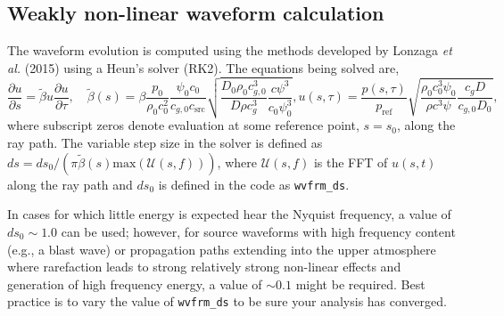\documentclass[10pt]{article}
\begin{document}
\subsection{Weakly non-linear waveform calculation}

The waveform evolution is computed using the methods developed by Lonzaga \textit{et al.} (2015) using a Heun's solver (RK2).  The equations being solved are,
\begin{subequations}
\begin{equation}
\frac{\partial u}{\partial s} = \tilde{\beta} u \frac{\partial u}{\partial \tau}, \quad 
\tilde{\beta} \left( s\right) = \beta \frac{p_0}{\rho_0 c_0^2} \frac{\psi_0 c_0}{c_{g,0} c_\text{src}} \sqrt{ \frac{D_0 \rho_0 c_{g,0}^3}{D \rho c_g^3} \frac{c \psi^3}{c_0 \psi_0^3}},
\end{equation}
\begin{equation}
 u \left( s, \tau \right) = \frac{p \left( s, \tau \right)}{p_\text{ref}} \sqrt{ \frac{\rho_0 c_0^3 \psi_0}{\rho c^3 \psi} \frac{c_{g} D}{c_{g,0} D_0}},
\end{equation}
\end{subequations}
where subscript zeros denote evaluation at some reference point, \(s = s_0\), along the ray path.  The variable step size in the solver is defined as \(ds = ds_0 /  \left( \pi \tilde{\beta} \left( s \right) \text{max} \left(\mathcal{U} \left( s, f \right) \right) \right)\), where \(\mathcal{U} \left( s, f \right)\) is the FFT of \(u \left(s, t \right)\) along the ray path and \(ds_0\) is defined in the code as \verb=wvfrm_ds=.  

In cases for which little energy is expected hear the Nyquist frequency, a value of \(ds_0 \sim1.0\) can be used; however, for source waveforms with high frequency content (e.g., a blast wave) or propagation paths extending into the upper atmosphere where rarefaction leads to strong relatively strong non-linear effects and generation of high frequency energy, a value of \(\sim0.1\) might be required.  Best practice is to vary the value of \verb=wvfrm_ds= to be sure your analysis has converged.
\end{document}
